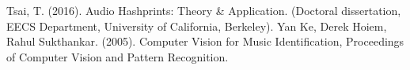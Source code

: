 \nocite{*}

\begin{thebibliography}{9}
    Tsai, T. (2016). Audio Hashprints: Theory \& Application.
    (Doctoral dissertation, EECS Department, University of California, Berkeley).
    Yan Ke, Derek Hoiem, Rahul Sukthankar. (2005). Computer Vision for Music
    Identification, Proceedings of Computer Vision and Pattern Recognition.
\end{thebibliography}